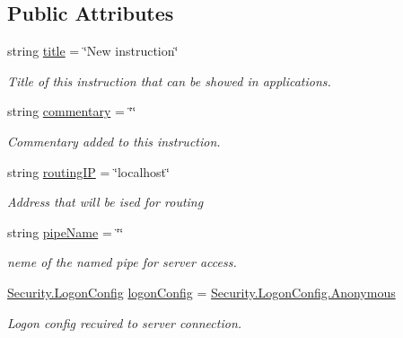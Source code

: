 \subsection*{Public Attributes}
\begin{DoxyCompactItemize}
\item 
string \mbox{\hyperlink{class_pipes_provider_1_1_networking_1_1_routing_1_1_instruction_afc65118594a1953afeef63ff3d8e4506}{title}} = \char`\"{}New instruction\char`\"{}
\begin{DoxyCompactList}\small\item\em Title of this instruction that can be showed in applications. \end{DoxyCompactList}\item 
string \mbox{\hyperlink{class_pipes_provider_1_1_networking_1_1_routing_1_1_instruction_a5b9d2229bd3188741d97b334106d1611}{commentary}} = \char`\"{}\char`\"{}
\begin{DoxyCompactList}\small\item\em Commentary added to this instruction. \end{DoxyCompactList}\item 
string \mbox{\hyperlink{class_pipes_provider_1_1_networking_1_1_routing_1_1_instruction_adb75f80ff34fab644305856ccf23d07b}{routing\+IP}} = \char`\"{}localhost\char`\"{}
\begin{DoxyCompactList}\small\item\em Address that will be ised for routing \end{DoxyCompactList}\item 
string \mbox{\hyperlink{class_pipes_provider_1_1_networking_1_1_routing_1_1_instruction_abe54e245df8dd26547b0c881b987202b}{pipe\+Name}} = \char`\"{}\char`\"{}
\begin{DoxyCompactList}\small\item\em neme of the named pipe for server access. \end{DoxyCompactList}\item 
\mbox{\hyperlink{struct_pipes_provider_1_1_security_1_1_logon_config}{Security.\+Logon\+Config}} \mbox{\hyperlink{class_pipes_provider_1_1_networking_1_1_routing_1_1_instruction_a2a3325abd7537b7a961626272634e038}{logon\+Config}} = \mbox{\hyperlink{struct_pipes_provider_1_1_security_1_1_logon_config_ad09f6e3c892826dc5df995e02f7a5738}{Security.\+Logon\+Config.\+Anonymous}}
\begin{DoxyCompactList}\small\item\em Logon config recuired to server connection. \end{DoxyCompactList}\item 

\end{DoxyCompactItemize}
